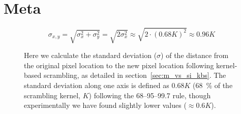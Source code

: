 \chapter{Meta}
\begin{figure}
\[ \sigma_{x,y} = \sqrt{\sigma_{x}^{2}+\sigma_{y}^{2}} = \sqrt{2\sigma_{x}^{2}} \approx \sqrt{2 \cdot (0.68 K)^{2}} \approx 0.96K\]
\caption{Here we calculate the standard deviation ($\sigma$) of the distance from the original pixel location to the new pixel location following kernel-based scrambling, as detailed in section~\ref{sec:m_vs_si_kbs}. The standard deviation along one axis is defined as $0.68K$ (\SI{68}{\percent} of the scrambling kernel, $K$) following the 68–95–99.7 rule, though experimentally we have found slightly lower values ($\approx 0.6K$).}\label{eq:lrgn}
\end{figure}

